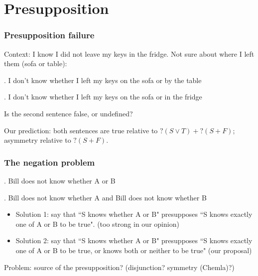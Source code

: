 \section{Presupposition}

\begin{frame}

\frametitle{Presupposition failure}

Context: I know I did not leave my keys in the fridge. Not sure
about where I left them (sofa or table):

\ex. I don't know whether I left my keys on the sofa or by the
table

\ex. I don't know whether I left my keys on the sofa or in the
fridge\pause

\bit

\item Is the second sentence false, or undefined?\pause

\item Our prediction: both sentences are true relative to $?(S\vee
T)+?(S+F)$; asymmetry relative to $?(S+F)$.

\eit

\end{frame}

\begin{frame}

\frametitle{The negation problem}

\ex. Bill does not know whether A or B

\ex. Bill does not know whether A and Bill does not know whether B

\begin{itemize}\pause

\item Solution 1: say that ``S knows whether A or B" presupposes
``S knows exactly one of A or B to be true". (too strong in our
opinion)\pause

\item Solution 2: say that ``S knows whether A or B" presupposes
``S knows exactly one of A or B to be true, or knows both or
neither to be true" (our proposal)

\end{itemize}\pause

Problem: source of the presupposition? (disjunction? symmetry
(Chemla)?)

\end{frame}

